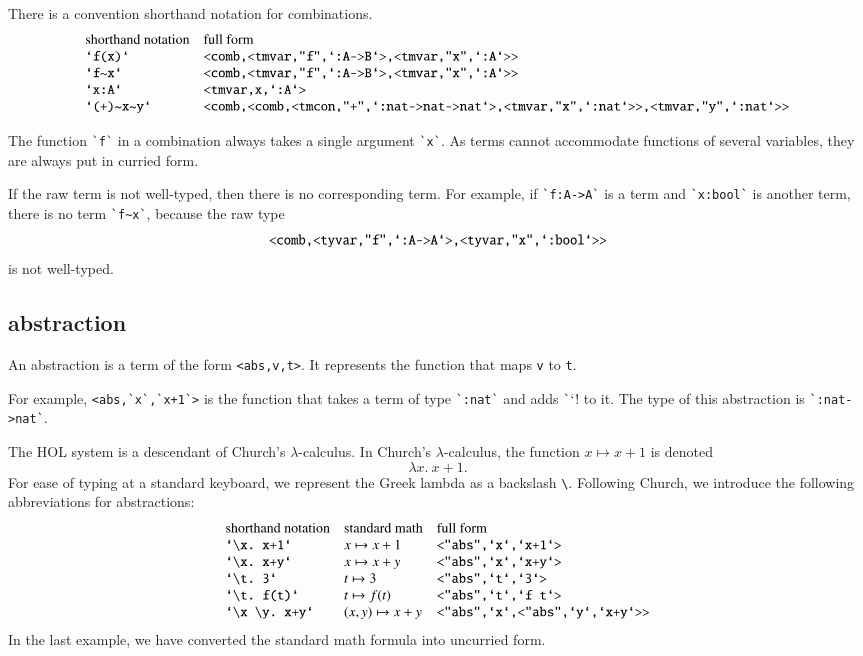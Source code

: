 \documentclass[cup9a]{cupbook}
\begin{document}
There is a convention shorthand notation for combinations.
$$
\begin{array}{lll}
\hbox{shorthand notation}&\hbox{full form}\\
\verb!`f(x)`! & \verb!<comb,<tmvar,"f",`:A->B`>,<tmvar,"x",`:A`>>!\\
\verb!`f~x`! & \verb!<comb,<tmvar,"f",`:A->B`>,<tmvar,"x",`:A`>>!\\
\verb!`x:A`!&\verb!<tmvar,x,`:A`>!\\
\verb!`(+)~x~y`! & \verb!<comb,<comb,<tmcon,"+",`:nat->nat->nat`>,<tmvar,"x",`:nat`>>,<tmvar,"y",`:nat`>>!\\
\end{array}
$$

The function \verb!`f`! in a combination always takes a single argument \verb!`x`!.  As terms cannot accommodate functions of several variables, they are always put in curried form.

If the raw term is not well-typed, then there is no corresponding term.  For example, if \verb!`f:A->A`! is a term and
\verb!`x:bool`! is another term, there is no term \verb!`f~x`!, because the raw type
$$
\verb!<comb,<tyvar,"f",`:A->A`>,<tyvar,"x",`:bool`>>!
$$
is not well-typed.

\subsection{abstraction}

An abstraction is a term of the form \verb!<abs,v,t>!.  It
represents the function that maps \verb!v! to \verb!t!.

For example, \verb!<abs,`x`,`x+1`>! is the function that
takes a term of type \verb!`:nat`! and adds \verb!`!`! to
it.  The type of this abstraction is \verb!`:nat->nat`!.

The HOL system is a descendant of Church's $\lambda$-calculus.
In Church's $\lambda$-calculus, the function $x\mapsto x+1$
is denoted
$$
\lambda x.~x+1.
$$
For ease of typing at a standard keyboard, we represent the Greek lambda as a backslash \verb!\!.
Following Church, we introduce the following abbreviations
for abstractions:
$$
\begin{array}{lll}
\hbox{shorthand notation}&\hbox{standard math}&\hbox{full form}\\
\verb!`\x. x+1`!&x\mapsto x+1&\verb!<"abs",`x`,`x+1`>!\\
\verb!`\x. x+y`!&x\mapsto x+y&\verb!<"abs",`x`,`x+y`>!\\
\verb!`\t. 3`!&t\mapsto 3&\verb!<"abs",`t`,`3`>!\\
\verb!`\t. f(t)`!&t\mapsto f(t)&\verb!<"abs",`t`,`f t`>!\\
\verb!`\x \y. x+y`!&(x,y)\mapsto x+y&\verb!<"abs",`x`,<"abs",`y`,`x+y`>>!\\
\end{array}
$$
In the last example, we have converted the standard math formula into uncurried form.
\end{document}
